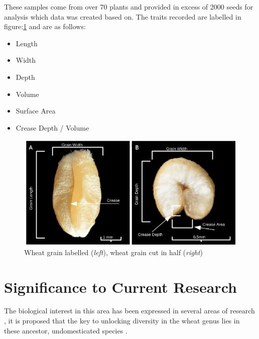 \documentclass[11pt]{report}
\begin{document}
These samples come from over 70 plants and provided in excess of 2000 seeds for analysis which data was created based on. The traits recorded are labelled in figure:\ref{fig:seeds} and are as follows:

\begin{multicols}{2}

  \begin{itemize}
  \item Length
  \item Width
  \item Depth

  \end{itemize}

  \columnbreak

  \begin{itemize}
  \item Volume
  \item Surface Area
  \item Crease Depth / Volume
  \end{itemize}


\end{multicols}


\begin{figure}[htb]
\centering
\includegraphics[width=17cm]{./images/seeds.png}
\caption{\label{fig:seeds}Wheat grain labelled (\emph{left}), wheat grain cut in half (\emph{right})}
\end{figure}

\section{Significance to Current Research}
\label{sec-1-3}
The biological interest in this area has been expressed in several areas of research \cite{Leigh2013}, it is proposed that the key to unlocking diversity in the wheat genus lies in these ancestor, undomesticated species \cite{Cockram2007}.
\end{document}
